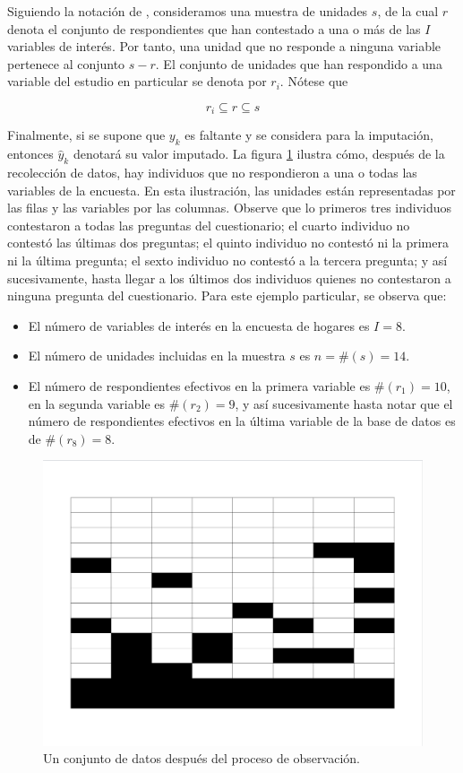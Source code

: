 \documentclass[
  12pt,
  spanish,
]{book}
\providecommand{\tightlist}{%
  \setlength{\itemsep}{0pt}\setlength{\parskip}{0pt}}
\begin{document}
Siguiendo la notación de \citet{Sarndal_Lundstrom_2006}, consideramos una muestra de unidades \(s\), de la cual \(r\) denota el conjunto de respondientes que han contestado a una o más de las \(I\) variables de interés. Por tanto, una unidad que no responde a ninguna variable pertenece al conjunto \(s-r\). El conjunto de unidades que han respondido a una variable del estudio en particular se denota por \(r_i\). Nótese que

\[
r_i\subseteq r \subseteq s
\]

Finalmente, si se supone que \(y_k\) es faltante y se considera para la imputación, entonces \(\hat{y}_k\) denotará su valor imputado. La figura \ref{fig:figbaseincom} ilustra cómo, después de la recolección de datos, hay individuos que no respondieron a una o todas las variables de la encuesta. En esta ilustración, las unidades están representadas por las filas y las variables por las columnas. Observe que lo primeros tres individuos contestaron a todas las preguntas del cuestionario; el cuarto individuo no contestó las últimas dos preguntas; el quinto individuo no contestó ni la primera ni la última pregunta; el sexto individuo no contestó a la tercera pregunta; y así sucesivamente, hasta llegar a los últimos dos individuos quienes no contestaron a ninguna pregunta del cuestionario. Para este ejemplo particular, se observa que:

\begin{itemize}
\tightlist
\item
  El número de variables de interés en la encuesta de hogares es \(I=8\).
\item
  El número de unidades incluidas en la muestra \(s\) es \(n=\#(s)=14\).
\item
  El número de respondientes efectivos en la primera variable es \(\#(r_1)=10\), en la segunda variable es \(\#(r_2)=9\), y así sucesivamente hasta notar que el número de respondientes efectivos en la última variable de la base de datos es de \(\#(r_8)=8\).
\end{itemize}

\begin{figure}
\includegraphics[width=0.5\linewidth]{Pics/j1} \caption{Un conjunto de datos después del proceso de observación.}\label{fig:figbaseincom}
\end{figure}
\end{document}
